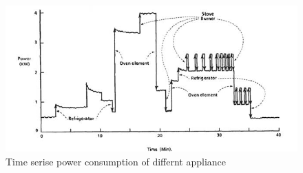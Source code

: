 \begin{figure}
	\centering
	\includegraphics[width=0.7\linewidth]{images/hart1}
	\caption[Time serise power consumption of differnt appliance]{Time serise power consumption of differnt appliance}
	\label{fig:hart1}
\end{figure}
